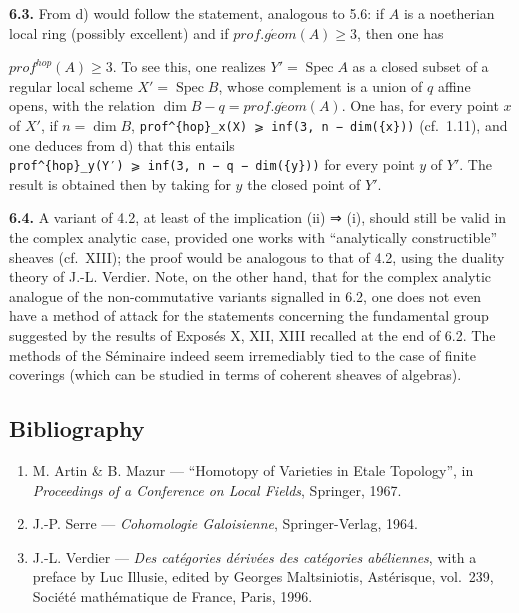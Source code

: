 \documentclass[
]{article}
\providecommand{\tightlist}{%
  \setlength{\itemsep}{0pt}\setlength{\parskip}{0pt}}
\begin{document}
\textbf{6.3.} From d) would follow the statement, analogous to 5.6: if
\(A\) is a noetherian local ring (possibly excellent) and if
\(prof.g\acute{e}om(A) \geqslant 3\), then one has

\(prof^{hop}(A) \geqslant 3\). To see this, one realizes
\(Y' = \operatorname{Spec} A\) as a closed subset of a regular local
scheme \(X' = \operatorname{Spec} B\), whose complement is a union of
\(q\) affine opens, with the relation
\(\dim B - q = prof.g\acute{e}om(A)\). One has, for every point \(x\) of
\(X'\), if \(n = \dim B\),
\texttt{prof\^{}\{hop\}\_x(X)\ ⩾\ inf(3,\ n\ −\ dim(\{x\}))} (cf.~1.11),
and one deduces from d) that this entails
\texttt{prof\^{}\{hop\}\_y(Y′)\ ⩾\ inf(3,\ n\ −\ q\ −\ dim(\{y\}))} for
every point \(y\) of \(Y'\). The result is obtained then by taking for
\(y\) the closed point of \(Y'\).

\textbf{6.4.} A variant of 4.2, at least of the implication (ii) ⇒ (i),
should still be valid in the complex analytic case, provided one works
with ``analytically constructible'' sheaves (cf.~XIII); the proof would
be analogous to that of 4.2, using the duality theory of J.-L. Verdier.
Note, on the other hand, that for the complex analytic analogue of the
non-commutative variants signalled in 6.2, one does not even have a
method of attack for the statements concerning the fundamental group
suggested by the results of Exposés X, XII, XIII recalled at the end of
6.2. The methods of the Séminaire indeed seem irremediably tied to the
case of finite coverings (which can be studied in terms of coherent
sheaves of algebras).

\subsection{Bibliography}\label{bibliography-4}

\begin{enumerate}
\def\labelenumi{\arabic{enumi}.}
\tightlist
\item
  M. Artin \& B. Mazur --- ``Homotopy of Varieties in Etale Topology'',
  in \emph{Proceedings of a Conference on Local Fields}, Springer, 1967.
\item
  J.-P. Serre --- \emph{Cohomologie Galoisienne}, Springer-Verlag, 1964.
\item
  J.-L. Verdier --- \emph{Des catégories dérivées des catégories
  abéliennes}, with a preface by Luc Illusie, edited by Georges
  Maltsiniotis, Astérisque, vol.~239, Société mathématique de France,
  Paris, 1996.
\end{enumerate}
\end{document}
